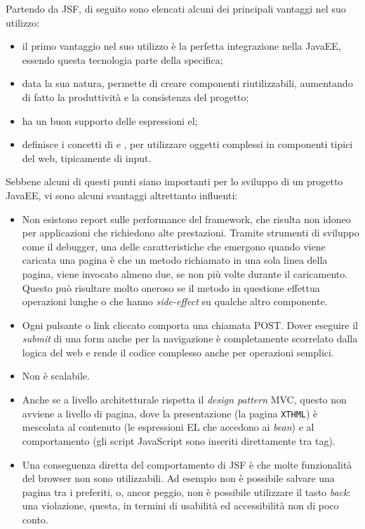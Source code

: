Partendo da JSF, di seguito sono elencati alcuni dei principali vantaggi nel suo utilizzo:
\begin{itemize}
	\item il primo vantaggio nel suo utilizzo è la perfetta integrazione nella JavaEE, essendo questa tecnologia parte della specifica;
	\item data la sua natura, permette di creare componenti riutilizzabili, aumentando di fatto la produttività e la consistenza del progetto;
	\item ha un buon supporto delle espressioni \gls{el};
	\item definisce i concetti di  e , per utilizzare oggetti complessi in componenti tipici del web, tipicamente di input.
\end{itemize}
Sebbene alcuni di questi punti siano importanti per lo sviluppo di un progetto JavaEE, vi sono alcuni svantaggi altrettanto influenti:
\begin{itemize}
	\item Non esistono report sulle performance del framework, che risulta non idoneo per applicazioni che richiedono alte prestazioni. Tramite strumenti di sviluppo come il debugger, una delle caratteristiche che emergono quando viene caricata una pagina è che un metodo richiamato in una sola linea della pagina, viene invocato almeno due, se non più volte durante il caricamento. Questo può risultare molto oneroso se il metodo in questione effettua operazioni lunghe o che hanno \textit{side-effect} su qualche altro componente.
	\item Ogni pulsante o link cliccato comporta una chiamata POST. Dover eseguire il \textit{submit} di una form anche per la navigazione è completamente scorrelato dalla logica del web e rende il codice complesso anche per operazioni semplici.
	\item Non è scalabile.
	\item Anche se a livello architetturale rispetta il \textit{design pattern} MVC, questo non avviene a livello di pagina, dove la presentazione (la pagina \texttt{XTHML}) è mescolata al contenuto (le espressioni EL che accedono ai \textit{bean}) e al comportamento (gli script JavaScript sono inseriti direttamente tra tag).
	\item Una conseguenza diretta del comportamento di JSF è che molte funzionalità del browser non sono utilizzabili. Ad esempio non è possibile salvare una pagina tra i preferiti, o, ancor peggio, non è possibile utilizzare il tasto \textit{back}: una violazione, questa, in termini di usabilità ed accessibilità non di poco conto.
\end{itemize}
